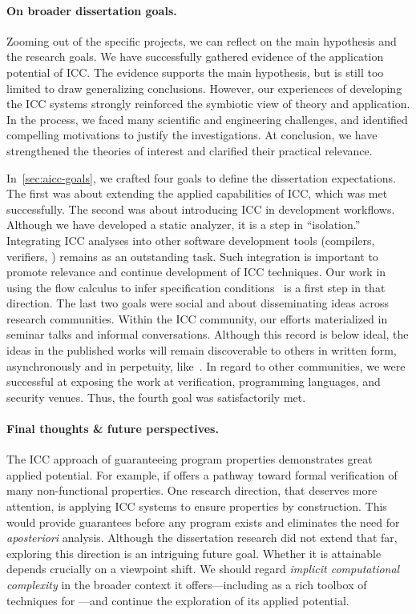 \paragraph*{On broader dissertation goals.} Zooming out of the specific
projects, we can reflect on the main hypothesis and the research goals. We have
successfully gathered evidence of the application potential of ICC. The evidence
supports the main hypothesis, but is still too limited to draw generalizing
conclusions. However, our experiences of developing the ICC systems strongly
reinforced the symbiotic view of theory and application. In the process, we
faced many scientific and engineering challenges, and identified compelling
motivations to justify the investigations. At conclusion, we have strengthened
the theories of interest and clarified their practical relevance.

In~\autoref{sec:aicc-goals}, we crafted four goals to define the dissertation
expectations. The first was about extending the applied capabilities of ICC,
which was met successfully. The second was about introducing ICC in development
workflows. Although we have developed a static analyzer, it is a step in
\enquote{isolation.} Integrating ICC analyses into other software development
tools (compilers, verifiers, \etc) remains as an outstanding task. Such
integration is important to promote relevance and continue development of ICC
techniques. Our work in using the flow calculus to infer
specification conditions~\cite{rusch2025} is a first step
in that direction. The last two goals were social and about disseminating ideas
across research communities. Within the ICC community, our efforts materialized
in seminar talks and informal conversations. Although this record is below
ideal, the ideas in the published works will remain discoverable to others in
written form, asynchronously and in perpetuity, like~\cite{moyen2017}. In regard
to other communities, we were successful at exposing the work at verification,
programming languages, and security venues. Thus, the fourth goal was
satisfactorily met.

\paragraph*{Final thoughts \& future perspectives.} The ICC approach of
guaranteeing program properties demonstrates great applied potential. For
example, if offers a pathway toward formal verification of many non-functional
properties. One research direction, that deserves
more attention, is applying ICC systems to ensure properties by construction.
This would provide guarantees before any program exists and eliminates the need
for \emph{aposteriori} analysis. Although the dissertation research did not
extend that far, exploring this direction is an intriguing future goal. Whether
it is attainable depends crucially on a viewpoint shift. We should regard
\emph{implicit computational complexity} in the broader context it
offers---including as a rich toolbox of techniques for ---and continue the exploration of its applied potential.
